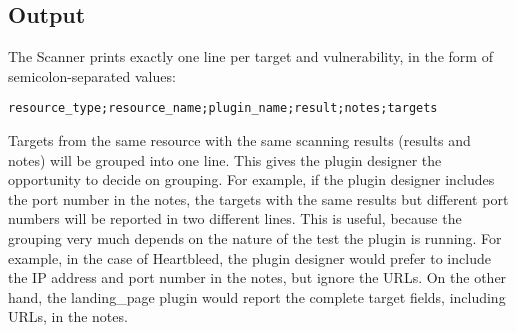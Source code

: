 \subsection{Output}
The Scanner prints exactly one line per target and vulnerability, in the form of semicolon-separated values:
\begin{verbatim}
resource_type;resource_name;plugin_name;result;notes;targets
\end{verbatim}
Targets from the same resource with the same scanning results (results and notes) will be grouped into one line. This gives the plugin designer the opportunity to decide on grouping. For example, if the plugin designer includes the port number in the notes, the targets with the same results but different port numbers will be reported in two different lines. This is useful, because the grouping very much depends on the nature of the test the plugin is running. For example, in the case of Heartbleed, the plugin designer would prefer to include the IP address and port number in the notes, but ignore the URLs. On the other hand, the landing\_page plugin would report the complete target fields, including URLs, in the notes.
